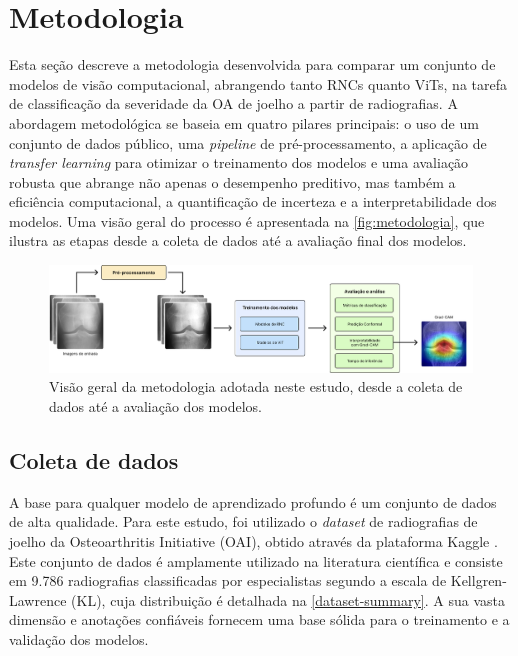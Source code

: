 \chapter{Metodologia}\label{cap:proposta}

Esta seção descreve a metodologia desenvolvida para comparar um conjunto de modelos de visão computacional, abrangendo tanto RNCs quanto ViTs, na tarefa de classificação da severidade da OA de joelho a partir de radiografias. A abordagem metodológica se baseia em quatro pilares principais: o uso de um conjunto de dados público, uma \textit{pipeline} de pré-processamento, a aplicação de \textit{transfer learning} para otimizar o treinamento dos modelos e uma avaliação robusta que abrange não apenas o desempenho preditivo, mas também a eficiência computacional, a quantificação de incerteza e a interpretabilidade dos modelos. Uma visão geral do processo é apresentada na \autoref{fig:metodologia}, que ilustra as etapas desde a coleta de dados até a avaliação final dos modelos.

\begin{figure}[ht]
    \centering
    \includegraphics[width=\linewidth]{figs/metodologia-pgc.png}
    \caption{Visão geral da metodologia adotada neste estudo, desde a coleta de dados até a avaliação dos modelos.}
    \label{fig:metodologia}
\end{figure}

\section{Coleta de dados}

A base para qualquer modelo de aprendizado profundo é um conjunto de dados de alta qualidade. Para este estudo, foi utilizado o \textit{dataset} de radiografias de joelho da Osteoarthritis Initiative (OAI), obtido através da plataforma Kaggle \citep{dataset-kaggle}. Este conjunto de dados é amplamente utilizado na literatura científica \citep{Tariq2023, Mohammed2023} e consiste em 9.786 radiografias classificadas por especialistas segundo a escala de Kellgren-Lawrence (KL), cuja distribuição é detalhada na \autoref{dataset-summary}. A sua vasta dimensão e anotações confiáveis fornecem uma base sólida para o treinamento e a validação dos modelos.

